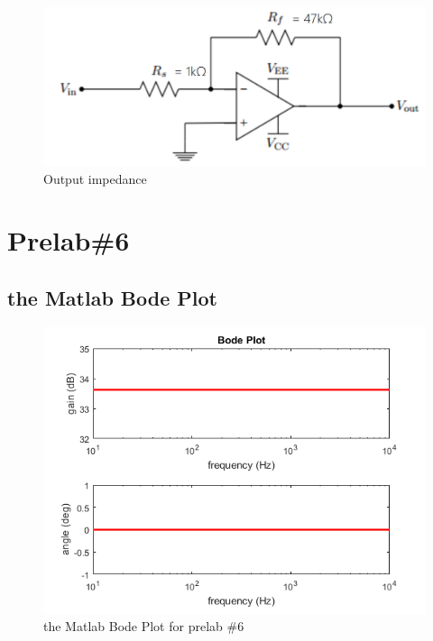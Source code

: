\documentclass{IEEEtran}
\begin{document}
	\begin{figure}[!htbp]
		\centering
		\begin{framed}
			\includegraphics[width=\linewidth]{images/2_1.PNG}
			\caption{Output impedance}
			\label{fig:501}
		\end{framed}
	\end{figure}

	\section{\textbf{Prelab\#6}}
	\subsection{the Matlab Bode Plot}
	\begin{figure}[!htbp]
		\centering
		\begin{framed}
			\includegraphics[width=\linewidth]{images/6.png}
			\caption{the Matlab Bode Plot for prelab \#6}
			\label{fig:301}
		\end{framed}
	\end{figure}
\end{document}
